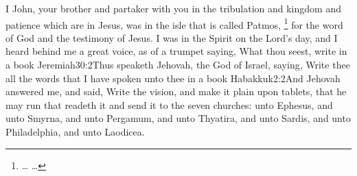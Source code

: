  I John, your brother and partaker with you in the tribulation and kingdom and patience which are in Jesus, was in the isle that is called Patmos,%
	\footnote{\ldots%
			\ldots%
			}%
for the word of God and the testimony of Jesus. %
 I was in the Spirit on the Lord’s day, and I heard behind me a great voice, as of a trumpet %
 saying, What thou seest, write in a book%
%
				{Jeremiah}{30:2}{Thus speaketh Jehovah, the God of Israel, saying, Write thee all the words that I have spoken unto thee in a book}%
				{Habakkuk}{2:2}{And Jehovah answered me, and said, Write the vision, and make it plain upon tablets, that he may run that readeth it}%
and send it to the seven churches: unto Ephesus, and unto Smyrna, and unto Pergamum, and unto Thyatira, and unto Sardis, and unto Philadelphia, and unto Laodicea.

